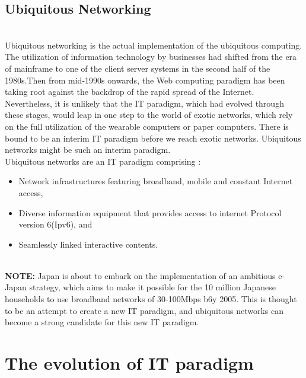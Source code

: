 \documentclass[12pt]{report}
\begin{document}
\section{ Ubiquitous Networking }\\
\hspace*{0.5in}Ubiquitous networking is the actual implementation of the ubiquitous computing. The utilization of information technology by businesses had shifted from the era of mainframe to one of the client server systems in the second half of the 1980s.Then from mid-1990s onwards, the Web computing paradigm has been taking root against the backdrop of the rapid spread of the Internet. Nevertheless, it is unlikely that the IT paradigm, which had evolved through these stages, would leap in one step to the world of exotic networks, which rely on the full utilization of the wearable computers or paper computers. There is bound to be an interim IT paradigm before we reach exotic networks. Ubiquitous networks might be such an interim paradigm.
\\Ubiquitous networks are an IT paradigm comprising :
\begin{itemize}
\item Network infrastructures featuring broadband, mobile and constant Internet access,
\item Diverse information equipment that provides access to internet Protocol version 6(Ipv6), and
\item Seamlessly linked interactive contents.
\end{itemize}

{\bf \\NOTE:} Japan is about to embark on the implementation of an ambitious e-Japan strategy, which aims to make it possible for the 10 million Japanese households to use broadband networks of 30-100Mbps b6y 2005. This is thought to be an attempt to create a new IT paradigm, and ubiquitous networks can become a strong candidate for this new IT paradigm.


\chapter{The evolution of IT paradigm}
\end{document}
